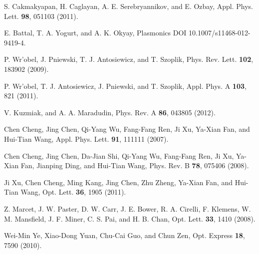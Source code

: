 \documentclass[10pt,letterpaper,twocolumn]{article} %
\begin{document}
\begin{thebibliography}{10}
S. Cakmakyapan, H. Caglayan, A. E. Serebryannikov, and E. Ozbay,
Appl. Phys. Lett. \textbf{98}, 051103 (2011).

E. Battal, T. A. Yogurt, and A. K. Okyay,
Plasmonics DOI 10.1007/s11468-012-9419-4.

P. Wr\a'{o}bel, J. Pniewski, T. J. Antosiewicz, and T. Szoplik,
Phys. Rev. Lett. \textbf{102}, 183902 (2009).

P. Wr\a'{o}bel, T. J. Antosiewicz, J. Pniewski, and T. Szoplik,
Appl. Phys. A \textbf{103}, 821 (2011).

V. Kuzmiak, and A. A. Maradudin, 
Phys. Rev. A \textbf{86}, 043805 (2012).

Chen Cheng, Jing Chen, Qi-Yang Wu, Fang-Fang Ren, Ji Xu, Ya-Xian Fan, and Hui-Tian Wang,
Appl. Phys. Lett. \textbf{91}, 111111 (2007).

Chen Cheng, Jing Chen, Da-Jian Shi, Qi-Yang Wu, Fang-Fang Ren, Ji Xu, Ya-Xian Fan, Jianping Ding, and Hui-Tian Wang,
Phys. Rev. B \textbf{78}, 075406 (2008).


Ji Xu, Chen Cheng, Ming Kang, Jing Chen, Zhu Zheng, Ya-Xian Fan, and Hui-Tian Wang, 
Opt. Lett. \textbf{36}, 1905 (2011). 

Z. Marcet, J. W. Paster, D. W. Carr, J. E. Bower, R. A. Cirelli, F. Klemens, W. M. Mansfield, J. F. Miner, C. S. Pai, and H. B. Chan, 
Opt. Lett. \textbf{33}, 1410 (2008). %

Wei-Min Ye, Xiao-Dong Yuan, Chu-Cai Guo, and Chun Zen, 
Opt. Express \textbf{18}, 7590 (2010).  




\end{thebibliography}
\end{document}
